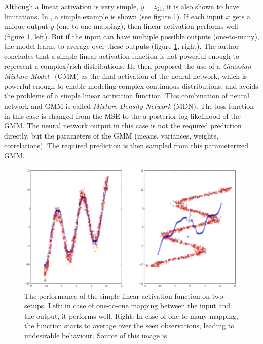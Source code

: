       \par Although a linear activation is very simple, $y=z_{21}$, it is also shown to have limitations. In \citep{bishop1994mixture}, a simple example is shown (see figure \ref{fig:linear_activation_issue}). If each input $x$ gets a unique output $y$ (one-to-one mapping), then linear activation performs well (figure \ref{fig:linear_activation_issue}, left). But if the input can have multiple possible outputs (one-to-many), the model learns to average over these outputs (figure \ref{fig:linear_activation_issue}, right). The author concludes that a simple linear activation function is not powerful enough to represent a complex/rich distributions. He then proposed the use of a \textit{Gaussian Mixture Model}~\citep{Murphy:2012:MLP:2380985} (GMM) as the final activation of the neural network, which is powerful enough to enable modeling complex continuous distributions, and avoids the problems of a simple linear activation function. This combination of neural network and GMM is called \textit{Mixture Density Network} (MDN). The loss function in this case is changed from the MSE to the a posterior log-likelihood of the GMM. The neural network output in this case is not the required prediction directly, but the parameters of the GMM (means, variances, weights, correlations). The required prediction is then sampled from this parameterized GMM.

      \begin{figure}[!htbp]
          \centering
          \includegraphics[scale=0.3]{images/sota/linear_activation_problem.png}
          \caption{The performance of the simple linear activation function on two setups. Left: in case of one-to-one mapping between the input and the output, it performs well. Right: In case of one-to-many mapping, the function starts to average over the seen observations, leading to undesirable behaviour. Source of this image is \citep{ha2015mdntf}.}
          \label{fig:linear_activation_issue}
      \end{figure}

